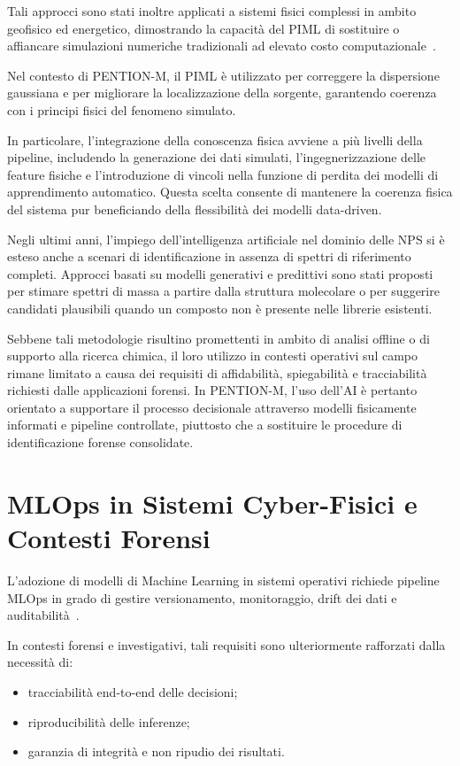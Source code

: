Tali approcci sono stati inoltre applicati a sistemi fisici complessi in ambito geofisico ed energetico, dimostrando la capacità del PIML di sostituire o affiancare simulazioni numeriche tradizionali ad elevato costo computazionale~\cite{geoenergy_piml_review}.

Nel contesto di PENTION-M, il PIML è utilizzato per correggere la dispersione gaussiana e per migliorare la localizzazione della sorgente, garantendo coerenza con i principi fisici del fenomeno simulato.

In particolare, l’integrazione della conoscenza fisica avviene a più livelli della pipeline,
includendo la generazione dei dati simulati, l’ingegnerizzazione delle feature fisiche e
l’introduzione di vincoli nella funzione di perdita dei modelli di apprendimento automatico.
Questa scelta consente di mantenere la coerenza fisica del sistema pur beneficiando
della flessibilità dei modelli data-driven.

Negli ultimi anni, l’impiego dell’intelligenza artificiale nel dominio delle NPS si è esteso
anche a scenari di identificazione in assenza di spettri di riferimento completi.
Approcci basati su modelli generativi e predittivi sono stati proposti per stimare spettri
di massa a partire dalla struttura molecolare o per suggerire candidati plausibili quando
un composto non è presente nelle librerie esistenti.

Sebbene tali metodologie risultino promettenti in ambito di analisi offline o di supporto
alla ricerca chimica, il loro utilizzo in contesti operativi sul campo rimane limitato a causa
dei requisiti di affidabilità, spiegabilità e tracciabilità richiesti dalle applicazioni forensi.
In PENTION-M, l’uso dell’AI è pertanto orientato a supportare il processo decisionale
attraverso modelli fisicamente informati e pipeline controllate, piuttosto che a sostituire
le procedure di identificazione forense consolidate.

\section{MLOps in Sistemi Cyber-Fisici e Contesti Forensi}
\label{sec:mlops}

L’adozione di modelli di Machine Learning in sistemi operativi richiede pipeline MLOps in grado di gestire versionamento, monitoraggio, drift dei dati e auditabilità~\cite{faubel2023mlops_industry, calefato_secmlops}.

In contesti forensi e investigativi, tali requisiti sono ulteriormente rafforzati dalla necessità di:
\begin{itemize}
	\item tracciabilità end-to-end delle decisioni;
	\item riproducibilità delle inferenze;
	\item garanzia di integrità e non ripudio dei risultati.
\end{itemize}

